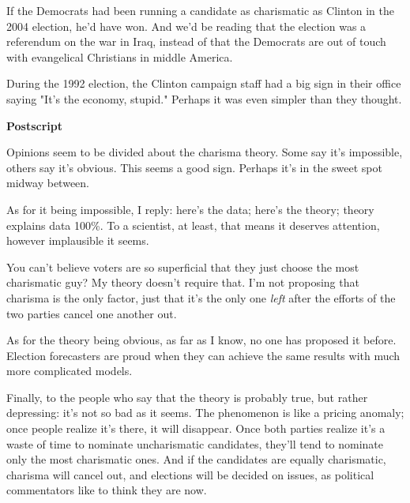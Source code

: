 If the Democrats had been running a
                  candidate as charismatic as Clinton in the 2004 election, he'd
                  have won. And we'd be reading that the election was a
                  referendum on the war in Iraq, instead of that the Democrats
                  are out of touch with evangelical Christians in middle
                  America.

During the 1992 election, the Clinton
                  campaign staff had a big sign in their office saying "It's the
                  economy, stupid." Perhaps it was even simpler than they
                  thought.





\textbf{Postscript}

Opinions seem to be divided about the charisma
                  theory. Some say it's impossible, others say it's obvious.
                  This seems a good sign. Perhaps it's in the sweet spot midway
                  between.

As for it being impossible, I reply:
                  here's the data; here's the theory; theory explains data 100\%.
                  To a scientist, at least, that means it deserves attention,
                  however implausible it seems.

You can't believe
                  voters are so superficial that they just choose the most
                  charismatic guy? My theory doesn't require that. I'm not
                  proposing that charisma is the only factor, just that it's the
                  only one \emph{left} after the efforts of the two parties
                  cancel one another out.

As for the theory being
                  obvious, as far as I know, no one has proposed it before.
                  Election forecasters are proud when they can achieve the same
                  results with much more complicated models.

Finally,
                  to the people who say that the theory is probably true, but
                  rather depressing: it's not so bad as it seems. The phenomenon
                  is like a pricing anomaly; once people realize it's there, it
                  will disappear. Once both parties realize it's a waste of time
                  to nominate uncharismatic candidates, they'll tend to nominate
                  only the most charismatic ones. And if the candidates are
                  equally charismatic, charisma will cancel out, and elections
                  will be decided on issues, as political commentators like to
                  think they are now.



